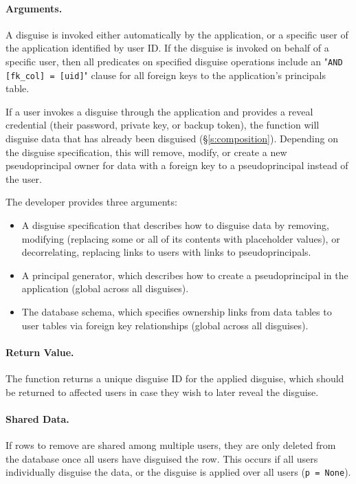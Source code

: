     \paragraph{Arguments.} 
    A disguise is invoked either automatically by the application, or a specific
    user of the application identified by user ID. 
    If the disguise is invoked on behalf of a specific user, then all predicates
    on specified disguise operations include an "\texttt{AND [fk\_col] = [uid]}"
    clause for all foreign keys to the application's principals table.

    If a user invokes a disguise through the application and provides a reveal
    credential (their password, private key, or backup token), the function will
    disguise data that has already been disguised (\S\ref{s:composition}).
    Depending on the disguise specification, this will remove, modify, or create
    a new pseudoprincipal owner for data with a foreign key to a pseudoprincipal
    instead of the user.

    The developer provides three arguments:
    \begin{itemize}[nosep]
    \item A disguise specification that describes how to disguise data by
    removing, modifying (replacing some or all of its contents with placeholder
    values), or decorrelating, replacing links to users with links to
    pseudoprincipals.
    
    \item A principal generator, which describes how to create a
    pseudoprincipal in the application (global across all disguises).
    
    \item The database schema, which specifies ownership links from data tables to user
    tables via foreign key relationships (global across all disguises).
    \end{itemize}

    \paragraph{Return Value.} 
    The function returns a unique disguise ID for the applied disguise, which
    should be returned to affected users in case they wish to later reveal the
    disguise.

    \paragraph{Shared Data.}
    If rows to remove are shared among multiple users, they are only deleted
    from the database once all users have disguised the row. This occurs if
    \one{} all users individually disguise the data, or \two{} the disguise is
    applied over all users (\texttt{p = None}).
   
